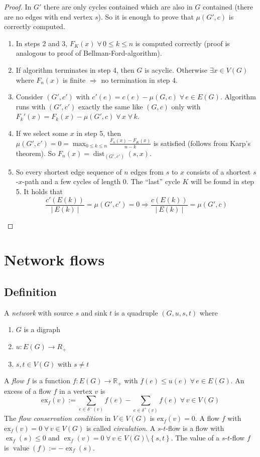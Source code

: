 \documentclass{article}
\newcommand{\card}[1]{\left|\:\!#1\:\!\right|}
\newcommand{\set}[1]{\left\{#1\right\}}
\newcommand{\gath}[2]{$#1$-$#2$-path} %
\newcommand{\flow}[2]{$#1$-$#2$-flow}
\newcommand{\fall}{\;\forall\,}
\DeclareMathOperator{\ex}{ex}
\begin{document}
\begin{proof}
  In $G'$ there are only cycles contained which are also in $G$ contained (there are no edges with end vertex $s$). So it is enough to prove that $\mu(G', c)$ is correctly computed.

  \begin{enumerate}
    \item In steps 2 and 3, $F_K(x) \fall 0 \leq k \leq n$ is computed correctly (proof is analogous to proof of Bellman-Ford-algorithm).
    \item If algorithm terminates in step 4, then $G$ is acyclic. Otherwise $\exists x \in V(G)$ where $F_n(x)$ is finite $\Rightarrow$ no termination in step 4.
    \item Consider $(G', c')$ with $c'(e) = c(e) - \mu(G, c) \fall e \in E(G)$. Algorithm runs with $(G', c')$ exactly the same like $(G, c)$ only with $F_k'(x) = F_k(x) - \mu(G', c) \fall x \fall k$.
    \item If we select some $x$ in step 5, then $\mu(G', c') = 0 = \max_{0 \leq k \leq n} \frac{F_n(x) - F_K(x)}{n-k}$ is satisfied (follows from Karp's theorem). So $F_n(x) = \operatorname{dist}_{(G', c')}(s, x)$.
    \item So every shortest edge sequence of $n$ edges from $s$ to $x$ consists of a shortest \gath sx and a few cycles of length $0$. The ``last'' cycle $K$ will be found in step 5. It holds that
    \[
      \frac{c'(E(k))}{\card{E(k)}} = \mu(G', c') = 0 \Rightarrow \frac{c(E(k))}{\card{E(k)}} = \mu(G', c)
    \]
  \end{enumerate}
\end{proof}

\section{Network flows}
%
\subsection{Definition}
%
A \emph{network} with source $s$ and sink $t$ is a quadruple $(G, u, s, t)$ where
\begin{enumerate}
  \item $G$ is a digraph
  \item $u: E(G) \rightarrow R_+$
  \item $s, t \in V(G)$ with $s \neq t$
\end{enumerate}

A \emph{flow} $f$ is a function $f: E(G) \rightarrow \mathbb{R}_+$ with $f(e) \leq u(e) \fall e \in E(G)$. An excess of a flow $f$ in a vertex $v$ is
\[
  \text{ex}_f(v) :=
    \sum_{e \in \delta^-(v)} f(e) -
    \sum_{e \in \delta^+(v)} f(e)
    \fall v \in V(G)
\]
The \emph{flow conservation condition} in $V \in V(G)$ is $\text{ex}_f(v) = 0$. A flow $f$ with $\text{ex}_f(v) = 0 \fall v \in V(G)$ is called \emph{circulation}. A \flow st is a flow with $\ex_f(s) \leq 0$ and $\ex_f(v) = 0 \fall v \in V(G) \setminus \set{s, t}$. The value of a \flow st $f$ is $\operatorname{value}(f) := -\ex_f(s)$.
\end{document}
